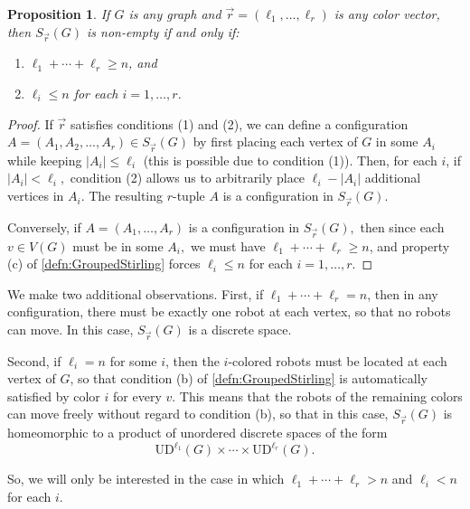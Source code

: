 \documentclass{amsart}
\newcommand{\Sr}{S_{\vec{r}}}
\newcommand{\UD}{\mathrm{UD}}
\newtheorem{prop}[thm]{Proposition}
\theoremstyle{definition}
\newtheorem{defn}[thm]{Definition}
\theoremstyle{remark}
\begin{document}
\begin{prop}
    If $G$ is any graph and $\vec{r}=(\ell_1,\dots,\ell_r)$ is any color vector, then $\Sr(G)$ is non-empty if and only if:
    \begin{enumerate}
        \item $\ell_1+\cdots+\ell_r\ge n$, and
        \item $\ell_i\le n$ for each $i=1,\dots,r$.
    \end{enumerate}
\end{prop}

\begin{proof}
    If $\vec{r}$ satisfies conditions (1) and (2), we can define a configuration $A=(A_1,A_2,\dots,A_r)\in\Sr(G)$ by first placing each vertex of $G$ in some $A_i$ while keeping $|A_i|\le \ell_i$ (this is possible due to condition (1)). Then, for each $i$, if $|A_i|<\ell_i,$ condition (2) allows us to arbitrarily place $\ell_i-|A_i|$ additional vertices in $A_i$. The resulting $r$-tuple $A$ is a configuration in $\Sr(G).$

    Conversely, if $A=(A_1,\dots,A_r)$ is a configuration in $\Sr(G),$ then since each $v\in V(G)$ must be in some $A_i,$ we must have $\ell_1+\cdots+\ell_r\ge n$, and property (c) of \cref{defn:GroupedStirling} forces $\ell_i\le n$ for each $i=1,\dots,r$.
\end{proof}

We make two additional observations. First, if $\ell_1+\cdots+\ell_r=n$, then in any configuration, there must be exactly one robot at each vertex, so that no robots can move. In this case, $\Sr(G)$ is a discrete space.

Second, if $\ell_i=n$ for some $i$, then the $i$-colored robots must be located at each vertex of $G$, so that condition (b) of \cref{defn:GroupedStirling} is automatically satisfied by color $i$ for every $v$. This means that the robots of the remaining colors can move freely without regard to condition (b), so that in this case, $\Sr(G)$ is homeomorphic to a product of unordered discrete spaces of the form 
\[
\UD^{\ell_1}(G)\times\cdots\times\UD^{\ell_r}(G).
\]

So, we will only be interested in the case in which $\ell_1+\cdots+\ell_r>n$ and $\ell_i<n$ for each $i.$

\end{document}
